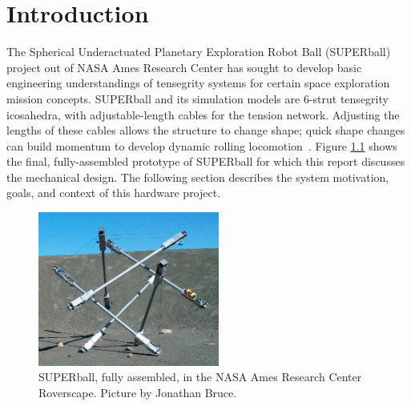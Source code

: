 \documentclass[12pt]{report}
\begin{document}

\chapter{Introduction}

The Spherical Underactuated Planetary Exploration Robot Ball (SUPERball) project out of NASA Ames Research Center has sought to develop basic engineering understandings of tensegrity systems for certain space exploration mission concepts.
SUPERball and its simulation models are 6-strut tensegrity icosahedra, with adjustable-length cables for the tension network.
Adjusting the lengths of these cables allows the structure to change shape; quick shape changes can build momentum to develop dynamic rolling locomotion~\cite{Iscen2013,iscen2014flop}.
Figure \ref{fig:overview} shows the final, fully-assembled prototype of SUPERball for which this report discusses the mechanical design.
The following section describes the system motivation, goals, and context of this hardware project.

\begin{figure}
  \begin{center}
  \vspace{-0.5cm}
    \includegraphics[width=0.53\textwidth]{img/superball_roverscape2_cropped.jpg}
    \caption{SUPERball, fully assembled, in the NASA Ames Research Center Roverscape. Picture by Jonathan Bruce.~\cite{sabelhaus2015system}}
    \label{fig:overview}
  \end{center}
  \vspace{-0.7cm}
\end{figure}
\end{document}

